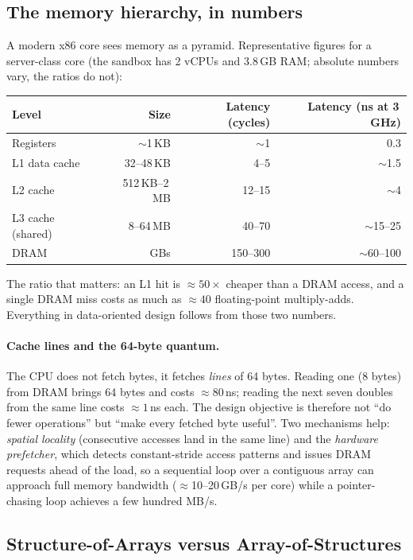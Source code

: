 \subsection{The memory hierarchy, in numbers}
\label{sec:sys:memory}

A modern x86 core sees memory as a pyramid. Representative figures for a server-class
core (the sandbox has 2 vCPUs and 3.8\,GB RAM; absolute numbers vary, the ratios do not):

\begin{center}
\renewcommand{\arraystretch}{1.2}
\begin{tabular}{lrrr}
\toprule
Level & Size & Latency (cycles) & Latency (ns at 3\,GHz) \\
\midrule
Registers & $\sim$1\,KB & $\sim$1 & 0.3 \\
L1 data cache & 32--48\,KB & 4--5 & $\sim$1.5 \\
L2 cache & 512\,KB--2\,MB & 12--15 & $\sim$4 \\
L3 cache (shared) & 8--64\,MB & 40--70 & $\sim$15--25 \\
DRAM & GBs & 150--300 & $\sim$60--100 \\
\bottomrule
\end{tabular}
\end{center}

The ratio that matters: an L1 hit is $\approx50\times$ cheaper than a DRAM access, and a
single DRAM miss costs as much as $\approx40$ floating-point multiply-adds. Everything in
data-oriented design follows from those two numbers.

\paragraph{Cache lines and the 64-byte quantum.} The CPU does not fetch bytes, it fetches
\emph{lines} of 64 bytes. Reading one  (8 bytes) from DRAM brings 64 bytes
and costs $\approx80$\,ns; reading the next seven doubles from the same line costs
$\approx1$\,ns each. The design objective is therefore not ``do fewer operations'' but
``make every fetched byte useful''. Two mechanisms help: \emph{spatial locality}
(consecutive accesses land in the same line) and the \emph{hardware prefetcher}, which
detects constant-stride access patterns and issues DRAM requests ahead of the load, so a
sequential loop over a contiguous array can approach full memory bandwidth
($\approx$10--20\,GB/s per core) while a pointer-chasing loop achieves a few hundred
MB/s.

\subsection{Structure-of-Arrays versus Array-of-Structures}
\label{sec:sys:soa}

